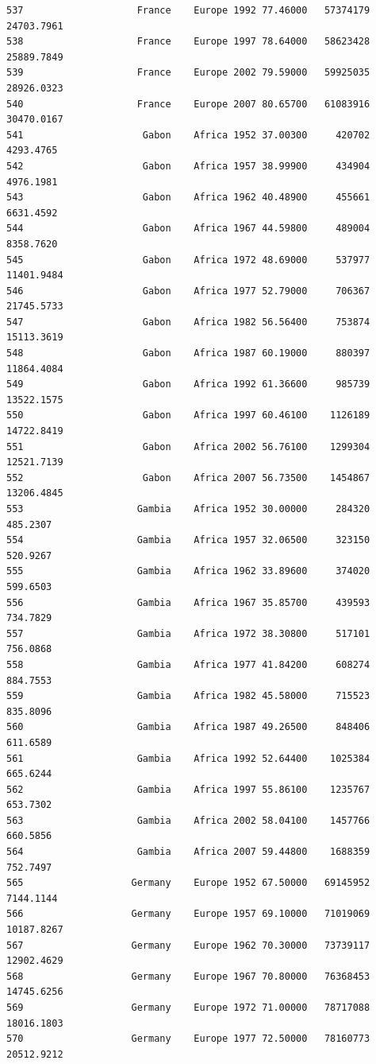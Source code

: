 \documentclass[
  letterpaper,
  DIV=11,
  numbers=noendperiod]{scrreprt}
\begin{document}
\begin{verbatim}
537                    France    Europe 1992 77.46000   57374179  24703.7961
538                    France    Europe 1997 78.64000   58623428  25889.7849
539                    France    Europe 2002 79.59000   59925035  28926.0323
540                    France    Europe 2007 80.65700   61083916  30470.0167
541                     Gabon    Africa 1952 37.00300     420702   4293.4765
542                     Gabon    Africa 1957 38.99900     434904   4976.1981
543                     Gabon    Africa 1962 40.48900     455661   6631.4592
544                     Gabon    Africa 1967 44.59800     489004   8358.7620
545                     Gabon    Africa 1972 48.69000     537977  11401.9484
546                     Gabon    Africa 1977 52.79000     706367  21745.5733
547                     Gabon    Africa 1982 56.56400     753874  15113.3619
548                     Gabon    Africa 1987 60.19000     880397  11864.4084
549                     Gabon    Africa 1992 61.36600     985739  13522.1575
550                     Gabon    Africa 1997 60.46100    1126189  14722.8419
551                     Gabon    Africa 2002 56.76100    1299304  12521.7139
552                     Gabon    Africa 2007 56.73500    1454867  13206.4845
553                    Gambia    Africa 1952 30.00000     284320    485.2307
554                    Gambia    Africa 1957 32.06500     323150    520.9267
555                    Gambia    Africa 1962 33.89600     374020    599.6503
556                    Gambia    Africa 1967 35.85700     439593    734.7829
557                    Gambia    Africa 1972 38.30800     517101    756.0868
558                    Gambia    Africa 1977 41.84200     608274    884.7553
559                    Gambia    Africa 1982 45.58000     715523    835.8096
560                    Gambia    Africa 1987 49.26500     848406    611.6589
561                    Gambia    Africa 1992 52.64400    1025384    665.6244
562                    Gambia    Africa 1997 55.86100    1235767    653.7302
563                    Gambia    Africa 2002 58.04100    1457766    660.5856
564                    Gambia    Africa 2007 59.44800    1688359    752.7497
565                   Germany    Europe 1952 67.50000   69145952   7144.1144
566                   Germany    Europe 1957 69.10000   71019069  10187.8267
567                   Germany    Europe 1962 70.30000   73739117  12902.4629
568                   Germany    Europe 1967 70.80000   76368453  14745.6256
569                   Germany    Europe 1972 71.00000   78717088  18016.1803
570                   Germany    Europe 1977 72.50000   78160773  20512.9212

\end{verbatim}
\end{document}
